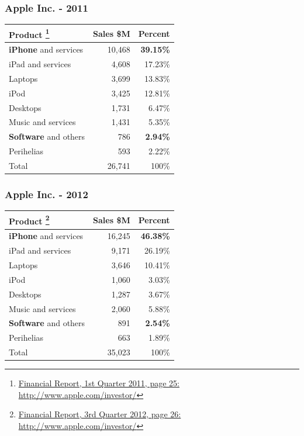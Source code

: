 \documentclass[18pt]{beamer}
\begin{document}
{
\begin{frame}
\frametitle{Apple Inc. - 2011}

\begin{center}
\begin{tabular}{lrr}
\hline
\textbf{Product}
\footnote{
\href{http://phx.corporate-ir.net/External.File?item=UGFyZW50SUQ9NzgwODJ8Q2hpbGRJRD0tMXxUeXBlPTM=&t=1}
{Financial Report, 1st Quarter 2011, page 25:}
 \url{http://www.apple.com/investor/} }
& \textbf{Sales \$M}
& \textbf{Percent} \\
\hline
\hline
\textbf{iPhone} and services & 10,468 & \textbf{39.15\%}  \\
iPad and services & 4,608 & 17.23\% \\
Laptops & 3,699 & 13.83\% \\
iPod & 3,425 & 12.81\% \\
Desktops & 1,731 & 6.47\% \\
Music and services & 1,431 & 5.35\%  \\
\textbf{Software} and others &  786 & \textbf{2.94\%} \\
Perihelias &  593 & 2.22\% \\
\hline
Total &  26,741 & 100\% \\
\end{tabular}

\end{center}
\end{frame}
}


{
\begin{frame}
\frametitle{Apple Inc. - 2012}

\begin{center}
\begin{tabular}{lrr}
\hline
\textbf{Product}
\footnote{
\href{http://files.shareholder.com/downloads/AAPL/2036902658x0x585701/beacb369-cb95-4950-acf4-4fbfa3569ec6/Q3\_2012\_Form\_10-Q\_As-Filed\_.pdf}
{Financial Report, 3rd Quarter 2012, page 26:}
 \url{http://www.apple.com/investor/} }
& \textbf{Sales \$M}
& \textbf{Percent} \\
\hline
\hline
\textbf{iPhone} and services & 16,245 &  \textbf{46.38\%}  \\
iPad and services & 9,171 & 26.19\% \\
Laptops & 3,646 & 10.41\% \\
iPod & 1,060 & 3.03\% \\
Desktops & 1,287 & 3.67\% \\
Music and services & 2,060 & 5.88\%  \\
\textbf{Software} and others &  891 & \textbf{2.54\%} \\
Perihelias &  663 & 1.89\% \\
\hline
Total &  35,023 & 100\% \\
\end{tabular}

\end{center}
\end{frame}
}
\end{document}
